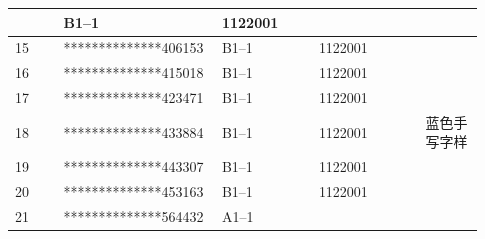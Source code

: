 \documentclass[UTF8,10pt,a4paper,fontset=fandol]{ctexart}
\newcommand{\fieldvalue}[1]{#1}
\newcommand{\handwritten}[1]{#1}
\begin{document}
\begin{tabular}{|p{0.10\linewidth}|p{0.29\linewidth}|p{0.20\linewidth}|p{0.22\linewidth}|p{0.12\linewidth}|}
&
\fieldvalue{B1--1}
&
\fieldvalue{1122001}
&\\
\hline
15 &
\fieldvalue{**************406153}
&
\fieldvalue{B1--1}
&
\fieldvalue{1122001}
&\\
\hline
16 &
\fieldvalue{**************415018}
&
\fieldvalue{B1--1}
&
\fieldvalue{1122001}
&\\
\hline
17 &
\fieldvalue{**************423471}
&
\fieldvalue{B1--1}
&
\fieldvalue{1122001}
&\\
\hline
18 &
\fieldvalue{**************433884}
&
\fieldvalue{B1--1}
&
\fieldvalue{1122001}
&
\fieldvalue{\handwritten{蓝色手写字样}}
\\
\hline
19 &
\fieldvalue{**************443307}
&
\fieldvalue{B1--1}
&
\fieldvalue{1122001}
&\\
\hline
20 &
\fieldvalue{**************453163}
&
\fieldvalue{B1--1}
&
\fieldvalue{1122001}
&\\
\hline
21 &
\fieldvalue{**************564432}
&
\fieldvalue{A1--1}
&

\end{tabular}
\end{document}
